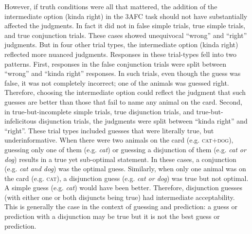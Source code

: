 \documentclass[,man,floatsintext]{apa6}
\begin{document}
However, if truth conditions were all that mattered, the addition of the intermediate option (kinda right) in the 3AFC task should not have substantially affected the judgments. In fact it did not in false simple trials, true simple trials, and true conjunction trials. These cases showed unequivocal \enquote{wrong} and \enquote{right} judgments. But in four other trial types, the intermediate option (kinda right) reflected more nuanced judgments.
Responses in these trial-types fell into two patterns. First, responses in the false conjunction trials were split between \enquote{wrong} and \enquote{kinda right} responses. In such trials, even though the guess was false, it was not completely incorrect; one of the animals was guessed right. Therefore, choosing the intermediate option could reflect the judgment that such guesses are better than those that fail to name any animal on the card. Second, in true-but-incomplete simple trials, true disjunction trials, and true-but-infelicitous disjunction trials, the judgments were split between \enquote{kinda right} and \enquote{right}. These trial types included guesses that were literally true, but underinformative. When there were two animals on the card (e.g. \textsc{cat+dog}), guessing only one of them (e.g. \emph{cat}) or guessing a disjunction of them (e.g. \emph{cat or dog}) results in a true yet sub-optimal statement. In these cases, a conjunction (e.g. \emph{cat and dog}) was the optimal guess. Similarly, when only one animal was on the card (e.g. \textsc{cat}), a disjunction guess (e.g. \emph{cat or dog}) was true but not optimal. A simple guess (e.g. \emph{cat}) would have been better. Therefore, disjunction guesses (with either one or both disjuncts being true) had intermediate acceptability. This is generally the case in the context of guessing and prediction: a guess or prediction with a disjunction may be true but it is not the best guess or prediction.
\end{document}
